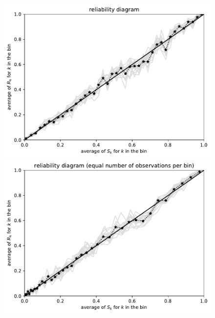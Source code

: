 \documentclass{article}
\begin{document}
\begin{figure}
\begin{centering}
\parbox{\imsize}{\includegraphics[width=\imsize]
                {./codes/unweighted/10000_40_1_3/equiprob.pdf}}
\quad\quad
\parbox{\imsize}{\includegraphics[width=\imsize]
                {./codes/unweighted/10000_40_1_3/equisamp.pdf}}

\vspace{\vertsep}


\end{centering}
\end{figure}
\end{document}
